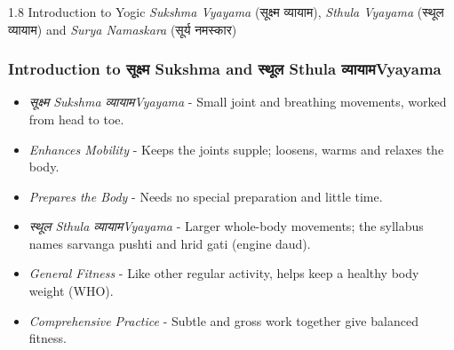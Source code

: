 \begin{frame}[fragile]\frametitle{}
\begin{center}
{\Large 1.8 Introduction to Yogic \textit{Sukshma Vyayama} (सूक्ष्म व्यायाम), \textit{Sthula Vyayama} (स्थूल व्यायाम) and \textit{Surya Namaskara} (सूर्य नमस्कार)}
\end{center}
\end{frame}

\begin{frame}[fragile]\frametitle{Introduction to सूक्ष्म Sukshma and स्थूल Sthula व्यायामVyayama}

  \begin{itemize}
	\item \textit{सूक्ष्म Sukshma व्यायामVyayama} - Small joint and breathing movements, worked from head to toe.
	\item \textit{Enhances Mobility} - Keeps the joints supple; loosens, warms and relaxes the body.
	\item \textit{Prepares the Body} - Needs no special preparation and little time.
	\item \textit{स्थूल Sthula व्यायामVyayama} - Larger whole-body movements; the syllabus names sarvanga pushti and hrid gati (engine daud).
	\item \textit{General Fitness} - Like other regular activity, helps keep a healthy body weight (WHO).
	\item \textit{Comprehensive Practice} - Subtle and gross work together give balanced fitness.
  \end{itemize}
\end{frame}




